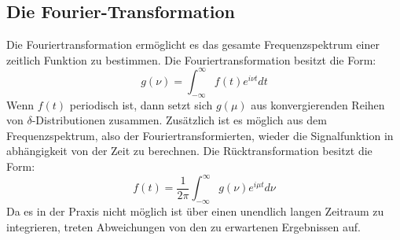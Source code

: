 \subsection{Die Fourier-Transformation}
Die Fouriertransformation ermöglicht es das gesamte Frequenzspektrum einer zeitlich Funktion zu bestimmen.
Die Fouriertransformation besitzt die Form:
\begin{equation}
  g(\nu)=\int_{-\infty}^{\infty}f(t)e^{i\nu t} dt
\end{equation}
Wenn $f(t)$ periodisch ist, dann setzt sich $g(\mu)$ aus konvergierenden Reihen von $\delta$-Distributionen zusammen.
Zusätzlich ist es möglich aus dem Frequenzspektrum, also der Fouriertransformierten, wieder die Signalfunktion in abhängigkeit von der Zeit zu berechnen.
Die Rücktransformation besitzt die Form:
\begin{equation}
  f(t)= \frac{1}{2\pi}\int_{-\infty}^{\infty} g(\nu) e^{i\mu t} d\nu
\end{equation}
Da es in der Praxis nicht möglich ist über einen unendlich langen Zeitraum zu integrieren, treten Abweichungen von den zu erwartenen Ergebnissen auf.
